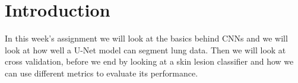 \section{Introduction}
In this week's assignment we will look at the basics behind CNNs and we will look at how well a U-Net model can segment lung data. Then we will look at cross validation, before we end by looking at a skin lesion classifier and how we can use different metrics to evaluate its performance.